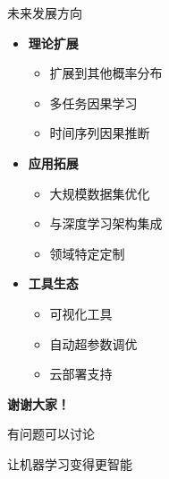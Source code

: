 \documentclass[aspectratio=169,12pt]{beamer}
\begin{document}
\begin{frame}{未来发展方向}
\begin{itemize}
    \item \textbf{理论扩展}
    \begin{itemize}
        \item 扩展到其他概率分布
        \item 多任务因果学习
        \item 时间序列因果推断
    \end{itemize}
    
    \item \textbf{应用拓展}
    \begin{itemize}
        \item 大规模数据集优化
        \item 与深度学习架构集成
        \item 领域特定定制
    \end{itemize}
    
    \item \textbf{工具生态}
    \begin{itemize}
        \item 可视化工具
        \item 自动超参数调优
        \item 云部署支持
    \end{itemize}
\end{itemize}
\end{frame}

\begin{frame}
\begin{center}
{\Huge \textbf{谢谢大家！}}

\vspace{2em}

{\Large 有问题可以讨论}

\vspace{2em}

{\large 让机器学习变得更智能 }
\end{center}
\end{frame}
\end{document}
